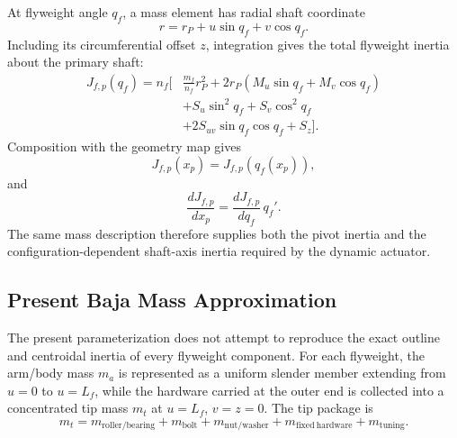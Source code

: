\documentclass[11pt]{report}
\numberwithin{equation}{section}
\begin{document}
At flyweight angle \(q_f\), a mass element has radial shaft coordinate
\begin{equation}
    r=r_P+u\sin q_f+v\cos q_f.
\end{equation}
Including its circumferential offset \(z\), integration gives the total
flyweight inertia about the primary shaft:
\begin{equation}
\boxed{
\begin{aligned}
    J_{f,p}(q_f)
    =n_f\Big[{}
    &\frac{m_f}{n_f} r_P^2
    +2r_P(M_u\sin q_f+M_v\cos q_f)\\
    &+S_u\sin^2q_f
    +S_v\cos^2q_f\\
    &+2S_{uv}\sin q_f\cos q_f
    +S_z
    \Big].
\end{aligned}
}
    \label{eq:appB_J_general}
\end{equation}
Composition with the geometry map gives
\begin{equation}
    \boxed{
    J_{f,p}(x_p)=J_{f,p}(q_f(x_p)),
    }
    \label{eq:appB_J_map}
\end{equation}
and
\begin{equation}
    \boxed{
    \frac{dJ_{f,p}}{dx_p}
    =
    \frac{dJ_{f,p}}{dq_f}\,q_f'.
    }
    \label{eq:appB_J_chain_rule}
\end{equation}
The same mass description therefore supplies both the pivot inertia and the
configuration-dependent shaft-axis inertia required by the dynamic actuator.

\subsection{Present Baja Mass Approximation}
\label{app:flyweight_simple_mass_model}

The present parameterization does not attempt to reproduce the exact outline and
centroidal inertia of every flyweight component. For each flyweight, the
arm/body mass \(m_a\) is represented as a uniform slender member extending from
\(u=0\) to \(u=L_f\), while the hardware carried at the outer end is collected
into a concentrated tip mass \(m_t\) at \(u=L_f\), \(v=z=0\). The tip package is
\begin{equation}
    m_t
    =
    m_{\mathrm{roller/bearing}}
    +m_{\mathrm{bolt}}
    +m_{\mathrm{nut/washer}}
    +m_{\mathrm{fixed\ hardware}}
    +m_{\mathrm{tuning}}.
    \label{eq:appB_tip_mass}
\end{equation}
\end{document}
